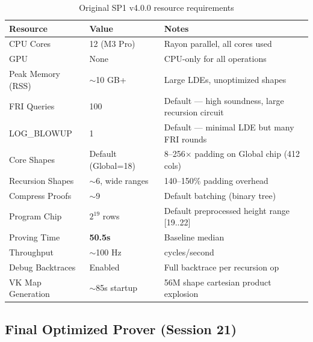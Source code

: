 \documentclass[11pt,a4paper]{article}
\begin{document}
\begin{table}[h]
\centering
\begin{tabular}{@{}L{3.5cm}L{3cm}L{7cm}@{}}
\toprule
\textbf{Resource} & \textbf{Value} & \textbf{Notes} \\
\midrule
CPU Cores & 12 (M3 Pro) & Rayon parallel, all cores used \\
GPU & None & CPU-only for all operations \\
Peak Memory (RSS) & $\sim$10 GB+ & Large LDEs, unoptimized shapes \\
FRI Queries & 100 & Default --- high soundness, large recursion circuit \\
LOG\_BLOWUP & 1 & Default --- minimal LDE but many FRI rounds \\
Core Shapes & Default (Global=18) & 8--256$\times$ padding on Global chip (412 cols) \\
Recursion Shapes & $\sim$6, wide ranges & 140--150\% padding overhead \\
Compress Proofs & $\sim$9 & Default batching (binary tree) \\
Program Chip & $2^{19}$ rows & Default preprocessed height range {[19..22]} \\
Proving Time & \textbf{50.5s} & Baseline median \\
Throughput & $\sim$100 Hz & cycles/second \\
Debug Backtraces & Enabled & Full backtrace per recursion op \\
VK Map Generation & $\sim$85s startup & 56M shape cartesian product explosion \\
\bottomrule
\end{tabular}
\caption{Original SP1 v4.0.0 resource requirements}
\end{table}

\subsection{Final Optimized Prover (Session 21)}
\end{document}
